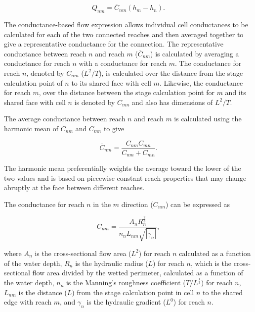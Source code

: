 \documentclass[fleqn]{article}
\begin{document}
\begin{equation}
  Q_{nm} = \overline{C}_{nm} \left ( h_m - h_n \right ).
\end{equation}

\noindent The conductance-based flow expression allows individual cell conductances to be calculated for each of the two connected reaches and then averaged together to give a representative conductance for the connection.  The representative conductance between reach $n$ and reach $m$ ($\overline{C}_{nm}$) is calculated by averaging a conductance for reach $n$ with a conductance for reach $m$.  The conductance for reach $n$, denoted by $C_{nm}$ ($L^2/T$), is calculated over the distance from the stage calculation point of $n$ to its shared face with cell $m$.  Likewise, the conductance for reach $m$, over the distance between the stage calculation point for $m$ and its shared face with cell $n$ is denoted by $C_{mn}$ and also has dimensions of $L^2/T$.

The average conductance between reach $n$ and reach $m$ is calculated using the harmonic mean of $C_{nm}$ and $C_{mn}$ to give

\begin{equation}
  \overline{C}_{nm} = \frac{C_{nm}  C_{mn}}{C_{nm} + C_{mn}}.
\end{equation}

\noindent The harmonic mean preferentially weights the average toward the lower of the two values and is based on piecewise constant reach properties that may change abruptly at the face between different reaches.

The conductance for reach $n$ in the $m$ direction ($C_{nm}$) can be expressed as

\begin{equation}
  C_{nm} = 
  \frac{
  A_n 
  R_{n}^{\frac{2}{3}}
  }
  {n_n
  L_{nm}
  \sqrt{| \gamma_n |}
  },
\label{eqn:cn}
\end{equation}

\noindent where $A_n$ is the cross-sectional flow area ($L^2$) for reach $n$ calculated as a function of the water depth, $R_n$ is the hydraulic radius ($L$) for reach $n$, which is the cross-sectional flow area divided by the wetted perimeter, calculated as a function of the water depth, $n_n$ is the Manning's roughness coefficient ($T/L^{\frac{1}{3}}$) for reach $n$,  $L_{nm}$ is the distance ($L$) from the stage calculation point in cell $n$ to the shared edge with reach $m$, and $\gamma_n$ is the hydraulic gradient ($L^0$) for reach $n$.
\end{document}
